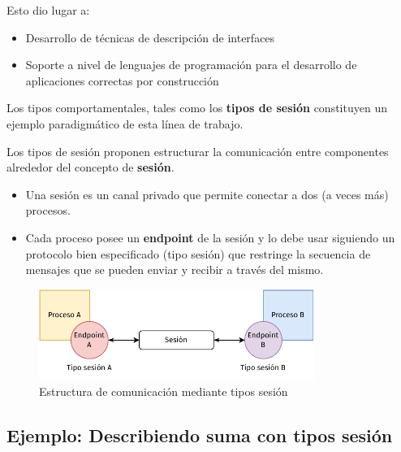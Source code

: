 \begin{frame}{\insertsection}

	Esto dio lugar a:

	\begin{itemize}
		\item Desarrollo de técnicas de descripción de interfaces
		\item Soporte a nivel de lenguajes de programación para el desarrollo de aplicaciones correctas por construcción
	\end{itemize}

	\pause

	Los tipos comportamentales, tales como los \textbf{tipos de sesión} constituyen
	un ejemplo paradigmático de esta línea de trabajo.
\end{frame}

\begin{frame}{\insertsection}
	Los tipos de sesión proponen estructurar la
	comunicación entre componentes alrededor del concepto de \textbf{sesión}.

	\begin{itemize}
		\item Una sesión es un canal privado que permite
			conectar a dos (a veces más) procesos.

		\item Cada proceso posee un \textbf{endpoint} de la sesión y lo
			debe usar siguiendo un protocolo bien especificado
			(tipo sesión) que restringe la secuencia de mensajes
			que se pueden enviar y recibir a través del mismo.
	\end{itemize}

	\begin{figure}
		\centering
		\includegraphics[width=0.8\textwidth]{images/tipo-sesion.pdf}
		\caption{Estructura de comunicación mediante tipos sesión}
	\end{figure}
\end{frame}

\subsection{Ejemplo: Describiendo suma con tipos sesión}


